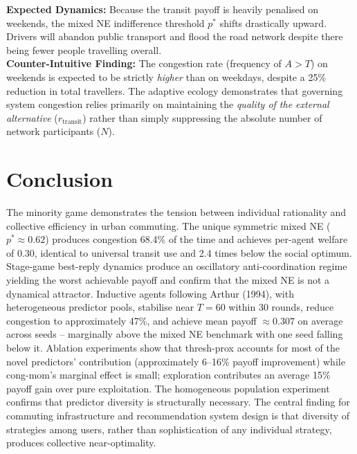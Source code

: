 \documentclass[letterpaper]{article}
\begin{document}
\textbf{Expected Dynamics:} Because the transit payoff is heavily penalised on weekends, the mixed NE indifference threshold $p^*$ shifts drastically upward. Drivers will abandon public transport and flood the road network despite there being fewer people travelling overall. \\

\textbf{Counter-Intuitive Finding:} The congestion rate (frequency of $A > T$) on weekends is expected to be strictly \textit{higher} than on weekdays, despite a 25\% reduction in total travellers. The adaptive ecology demonstrates that governing system congestion relies primarily on maintaining the \textit{quality of the external alternative} ($r_{\text{transit}}$) rather than simply suppressing the absolute number of network participants ($N$). \\

\section{Conclusion}

The minority game demonstrates the tension between individual rationality and collective efficiency in urban commuting. The unique symmetric mixed NE ($p^* \approx 0.62$) produces congestion 68.4\% of the time and achieves per-agent welfare of $0.30$, identical to universal transit use and 2.4 times below the social optimum. Stage-game best-reply dynamics produce an oscillatory anti-coordination regime yielding the worst achievable payoff and confirm that the mixed NE is not a dynamical attractor. Inductive agents following Arthur (1994), with heterogeneous predictor pools, stabilise near $T=60$ within 30 rounds, reduce congestion to approximately 47\%, and achieve mean payoff $\approx 0.307$ on average across seeds -- marginally above the mixed NE benchmark with one seed falling below it. Ablation experiments show that thresh-prox accounts for most of the novel predictors' contribution (approximately 6--16\% payoff improvement) while cong-mom's marginal effect is small; exploration contributes an average 15\% payoff gain over pure exploitation. The homogeneous population experiment confirms that predictor diversity is structurally necessary. The central finding for commuting infrastructure and recommendation system design is that diversity of strategies among users, rather than sophistication of any individual strategy, produces collective near-optimality. \\
\end{document}
